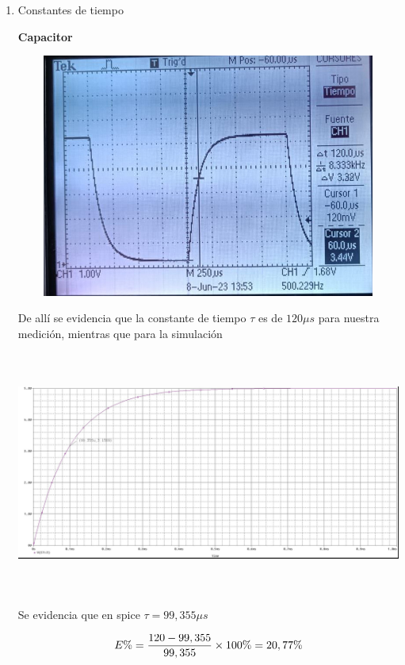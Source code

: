\documentclass[12pt]{article}
\begin{document}
\begin{enumerate}
	\item Constantes de tiempo
	
	\noindent \textbf{Capacitor}
	
	\begin{center}
		\includegraphics[width=16cm,height=8cm]{Img/capacitor}
	\end{center}

	\noindent De allí se evidencia que la constante de tiempo $\tau$ es de $120\mu s$ para nuestra medición, mientras que para la simulación
	
	\begin{center}
		\includegraphics[width=16cm,height=8cm]{Img/capacitor_spice}
	\end{center}

	\noindent Se evidencia que en spice $\tau = 99,355 \mu s$
	
	\begin{equation}
		\notag E\% = \frac{120 - 99,355}{99,355}\times 100\% = 20,77\%
	\end{equation}


\end{enumerate}
\end{document}
